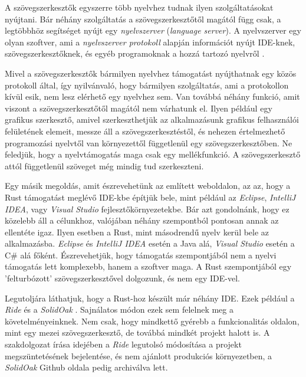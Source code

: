 A szövegszerkesztők egyszerre több nyelvhez tudnak ilyen szolgáltatásokat nyújtani. 
Bár néhány szolgáltatás a szövegszerkesztőtől magától függ csak, a legtöbbhöz segítséget nyújt egy \emph{nyelvszerver} (\emph{language server}). 
A nyelvszerver egy olyan szoftver, ami a \emph{nyelvszerver protokoll} alapján információt nyújt IDE-knek, szövegszerkesztőknek, és egyéb programoknak a hozzá tartozó nyelvről \cite{lsp}.

Mivel a szövegszerkesztők bármilyen nyelvhez támogatást nyújthatnak egy közös protokoll által, így nyilvánvaló, hogy bármilyen szolgáltatás, ami a protokollon kívül esik, nem lesz elérhető egy nyelvhez sem. 
Van továbbá néhány funkció, amit viszont a szövegszerkesztőtől magától nem várhatunk el. Ilyen például egy grafikus szerkesztő, amivel szerkeszthetjük az alkalmazásunk grafikus felhasználói felületének elemeit, messze áll a szövegszerkesztéstől, és nehezen értelmezhető programozási nyelvtől van környezettől függetlenül egy szövegszerkesztőben. 
Ne feledjük, hogy a nyelvtámogatás maga csak egy mellékfunkció.
A szövegszerkesztő attól függetlenül szöveget még mindig tud szerkeszteni.

Egy másik megoldás, amit észrevehetünk az említett weboldalon, az az, hogy a Rust támogatást meglévő IDE-kbe építjük bele, mint például az \textit{Eclipse}, \textit{IntelliJ IDEA}, vagy \textit{Visual Studio} fejlesztőkörnyezetekbe. 
Bár azt gondolnánk, hogy ez közelebb áll a célunkhoz, valójában néhány szempontból pontosan annak az ellentéte igaz. Ilyen esetben a Rust, mint másodrendű nyelv kerül bele az alkalmazásba.
\textit{Eclipse} és \textit{IntelliJ IDEA} esetén a Java alá, \textit{Visual Studio} esetén a C\# alá főként. 
Észrevehetjük, hogy támogatás szempontjából nem a nyelvi támogatás lett komplexebb, hanem a szoftver maga.
A Rust szempontjából egy 'felturbózott' szövegszerkesztővel dolgozunk, és nem egy IDE-vel.

Legutoljára láthatjuk, hogy a Rust-hoz készült már néhány IDE. Ezek például a \emph{Ride} \cite{ride} és a \emph{SolidOak} \cite{solidoak}. 
Sajnálatos módon ezek sem felelnek meg a követelményeinknek. Nem csak, hogy mindkettő gyérebb a funkcionalitás oldalon, mint egy mezei szövegszerkesztő, de továbbá mindkét projekt halott is. 
A szakdolgozat írása idejében a \textit{Ride} legutolsó módosítása a projekt megszüntetésének bejelentése, és nem ajánlott produkciós környezetben, a \textit{SolidOak} Github oldala pedig archiválva lett.


